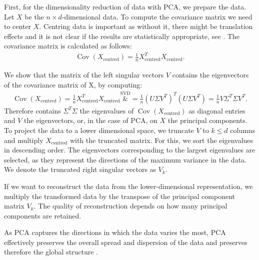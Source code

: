 \documentclass[pdftex,12pt,a4paper]{report}
\begin{document}
First, for the dimensionality reduction of data with PCA, we prepare the data.
Let $X$ be the $n \times d$-dimensional data.
To compute the covariance matrix we need to center $X$.
Centring data is important as without it, there might be translation effects and it is not clear if the results are statistically appropriate, see \cite{relation-centered-uncentered-PCA}.
The covariance matrix is calculated as follows:
\begin{align*}
    \operatorname{Cov}(X_{\mathrm{centred}}) = \frac{1}{n} X_{\mathrm{centred}} ^T X_{\mathrm{centred}}.
\end{align*}

We show that the matrix of the left singular vectors $V$ contains the eigenvectors of the covariance matrix of X, by computing:
\begin{align*}
    \operatorname{Cov}(X_{\mathrm{centred}}) = \frac{1}{n} X_{\mathrm{centred}}^T X_{\mathrm{centred}} \overset{\text{SVD}}&{=} \frac{1}{n}(U \Sigma V^T)^T (U \Sigma V^T) = \frac{1}{n} V \Sigma^T \Sigma V^T.
\end{align*}
Therefore contains $\Sigma^T \Sigma$ the eigenvalues of $\operatorname{Cov}(X_{\mathrm{centred}})$ as diagonal entries and $V$ the eigenvectors, or, in the case of PCA, on $X$ the principal components.
To project the data to a lower dimensional space, we truncate $V$ to $k \leq d$ columns and multiply $X_{\mathrm{centred}}$ with the truncated matrix.
For this, we sort the eigenvalues in descending order.
The eigenvectors corresponding to the largest eigenvalues are selected, as they represent the directions of the maximum variance in the data.
We denote the truncated right singular vectors as $V_k$.

If we want to reconstruct the data from the lower-dimensional representation, we multiply the transformed data by the transpose of the principal component matrix $V_k$.
The quality of reconstruction depends on how many principal components are retained.

As PCA captures the directions in which the data varies the most, PCA effectively preserves the overall spread and dispersion of the data and preserves therefore the global structure \cite{PCA-global-structure-preserving}.
\end{document}
